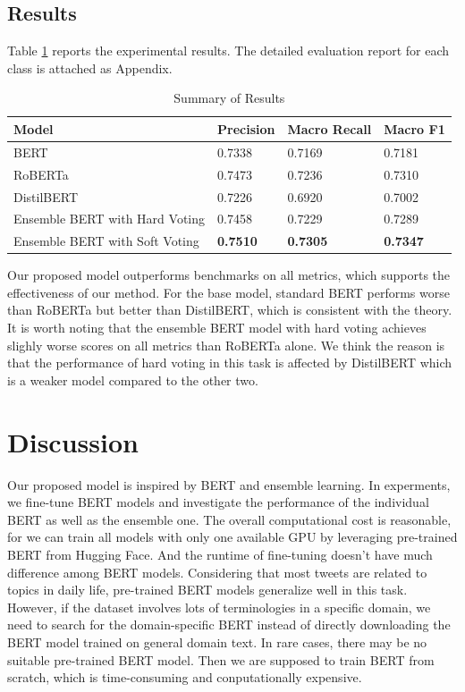 \documentclass[runningheads]{llncs}
\begin{document}
\subsection{Results}
Table \ref{tab:results} reports the experimental results. The detailed evaluation report for each class is attached as Appendix.

\begin{table}[!ht]
	\centering
	\caption{Summary of Results}
	\label{tab:results}
	\begin{tabular}{llll}
		\toprule
		\textbf{Model}       & \textbf{Precision} & \textbf{Macro Recall} & \textbf{Macro F1} \\ 
		\midrule
		BERT        & 0.7338     & 0.7169  & 0.7181    \\
		RoBERTa     & 0.7473     & 0.7236  & 0.7310    \\
		DistilBERT  & 0.7226     & 0.6920  & 0.7002    \\
		Ensemble BERT with Hard Voting & 0.7458     & 0.7229  & 0.7289    \\
        Ensemble BERT with Soft Voting & \textbf{0.7510}     & \textbf{0.7305}  & \textbf{0.7347}    \\ 
		\bottomrule
	\end{tabular}
\end{table}

Our proposed model outperforms benchmarks on all metrics, which supports the effectiveness of our method. For the base model, standard BERT performs worse than RoBERTa but better than DistilBERT, which is consistent with the theory. It is worth noting that the ensemble BERT model with hard voting achieves slighly worse scores on all metrics than RoBERTa alone. We think the reason is that the performance of hard voting in this task is affected by DistilBERT which is a weaker model compared to the other two.

\section{Discussion}
Our proposed model is inspired by BERT and ensemble learning. In experments, we fine-tune BERT models and investigate the performance of the individual BERT as well as the ensemble one. The overall computational cost is reasonable, for we can train all models with only one available GPU by leveraging pre-trained BERT from Hugging Face. And the runtime of fine-tuning doesn't have much difference among BERT models. Considering that most tweets are related to topics in daily life, pre-trained BERT models generalize well in this task. However, if the dataset involves lots of terminologies in a specific domain, we need to search for the domain-specific BERT instead of directly downloading the BERT model trained on general domain text. In rare cases, there may be no suitable pre-trained BERT model. Then we are supposed to train BERT from scratch, which is time-consuming and conputationally expensive.
\end{document}
